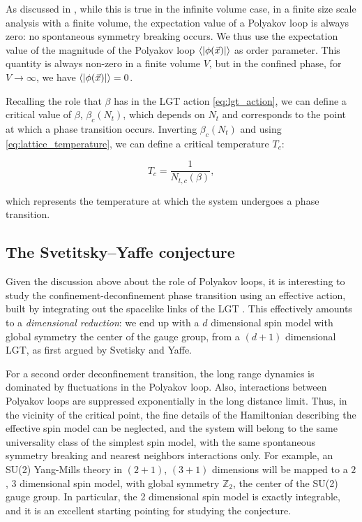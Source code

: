 \documentclass[reqno,12pt]{article}
\numberwithin{equation}{section}
\begin{document}
As discussed in \cite{pepe}, while this is true in the infinite volume case, in a finite size scale analysis with a finite volume, 
the expectation value of a Polyakov loop is always zero: no spontaneous symmetry breaking occurs. We thus use the expectation
value of the magnitude of the Polyakov loop $\expval{|\phi(\vec{x})|}$ as order parameter. This quantity is always non-zero in a finite
volume $V$, but in the confined phase, for $V \rightarrow \infty$, we have $\expval{|\phi(\vec{x})|} = 0$.

Recalling the role that $\beta$ has in the LGT action \eqref{eq:lgt_action}, we can define a critical value of $\beta$, 
$\beta_c(N_t)$, which depends on $N_t$ and corresponds to the point at which a phase transition occurs. Inverting $\beta_c(N_t)$ and
using \eqref{eq:lattice_temperature}, we can define a critical temperature $T_c$:

\begin{equation}
	T_c = \frac{1}{N_{t,c}(\beta)},
\end{equation}

which represents the temperature at which the system undergoes a phase transition.

\subsection{The Svetitsky–Yaffe conjecture}

Given the discussion above about the role of Polyakov loops, it is interesting to study the confinement-deconfinement phase transition
using an effective action, built by integrating out the spacelike links of the LGT \cite{caristo} \cite{caselle}. This effectively
amounts to a \textit{dimensional reduction}: we end up with a $d$ dimensional spin model with global symmetry the center of the
gauge group, from a $(d+1)$ dimensional LGT, as first argued by Svetisky and Yaffe.

For a second order deconfinement transition, the long range dynamics is dominated by fluctuations in the Polyakov loop. Also,
interactions between Polyakov loops are suppressed exponentially in the long distance limit. Thus, in the vicinity of the 
critical point, the fine details of the Hamiltonian describing the effective spin model can be neglected, and the system will belong
to the same universality class of the simplest spin model, with the same spontaneous symmetry breaking and nearest neighbors interactions
only. For example, an SU(2) Yang-Mills theory in $(2+1)$, $(3+1)$ dimensions will be mapped to a $2$, $3$ dimensional spin model, with
global symmetry $\mathbb{Z}_2$, the center of the SU(2) gauge group. In particular, the 2 dimensional spin model is exactly integrable,
and it is an excellent starting pointing for studying the conjecture. 
\end{document}
